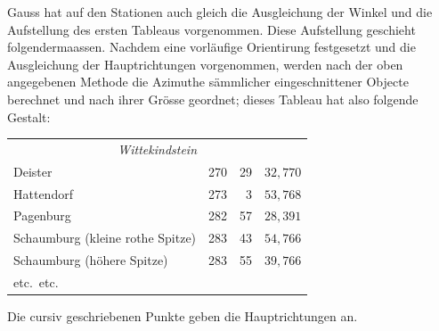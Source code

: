 \documentclass[12pt,a4paper]{article}
\theoremstyle{plain}
\theoremstyle{definition}
\theoremstyle{remark}
\begin{document}
Gauss hat auf den Stationen auch gleich die Ausgleichung der Winkel und die Aufstellung des ersten Tableaus vorgenommen. Diese Aufstellung geschieht folgendermaassen. Nachdem eine vorl\"aufige Orientirung festgesetzt und die Ausgleichung der Hauptrichtungen vorgenommen, werden nach der oben angegebenen Methode die Azimuthe s\"ammlicher eingeschnittener Objecte berechnet und nach ihrer Gr\"osse geordnet; dieses Tableau hat also folgende Gestalt:
\begin{center}
\begin{tabular}{l@{\quad}r@{${}^{\circ}$}r@{${}'$}l}
\multicolumn{4}{c}{\textit{Wittekindstein}}\\
Deister & 270 & 29 & $32{,}770$\\
Hattendorf & 273 & 3 & $53{,}768$\\
Pagenburg & 282 & 57 & $28{,}391$\\
Schaumburg (kleine rothe Spitze) & 283 & 43 & $54{,}766$\\
Schaumburg (h\"ohere Spitze) & 283 & 55 & $39{,}766$\\
etc.\ etc.
\end{tabular}
\end{center}
Die cursiv geschriebenen Punkte geben die Hauptrichtungen an.
\end{document}
